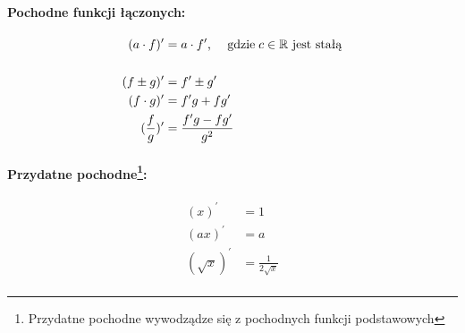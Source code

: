 \documentclass[draft]{article}
\begin{document}
    \paragraph{Pochodne funkcji łączonych:}
    \begin{align*}
        (a \cdot f)^\prime &= a \cdot f^\prime \text{, \quad gdzie} \; c \in \mathbb{R} \text{ jest stałą} \\
        \\
        (f \pm g)^\prime &= f^\prime \pm g^\prime \\
        (f \cdot g)^\prime &= f^\prime g + f g^\prime \\
        (\frac{f}{g})^\prime &= \frac{f^\prime g - f g^\prime}{g^2}
    \end{align*}

    \paragraph[Przydatne pochodne:]
        {Przydatne pochodne\footnote{Przydatne pochodne wywodządze się z pochodnych funkcji podstawowych}:}
    \begin{align*}
        (x)^\prime &= 1 \\
        (ax)^\prime &= a \\
        (\sqrt{x})^\prime &= \frac{1}{2\sqrt{x}} \\
    \end{align*}
\end{document}

